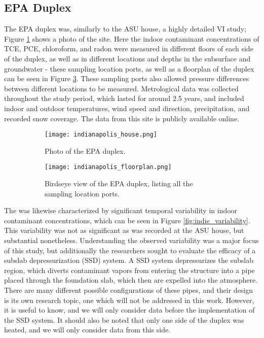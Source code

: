 \subsection{EPA Duplex}

The EPA duplex was, similarly to the ASU house, a highly detailed VI study; Figure \ref{fig:indie_house} shows a photo of the site.
Here the indoor contaminant concentrations of TCE, PCE, chloroform, and radon were measured in different floors of each side of the duplex, as well as in different locations and depths in the subsurface and groundwater - these sampling location ports, as well as a floorplan of the duplex can be seen in Figure \ref{fig:indie_floorplan}.
These sampling ports also allowed pressure differences between different locations to be measured.
Metrological data was collected throughout the study period, which lasted for around 2.5 years, and included indoor and outdoor temperatures, wind speed and direction, precipitation, and recorded snow coverage\cite{u.s._environmental_protection_agency_assessment_2015}.
The data from this site is publicly available online\cite{noauthor_indianapolis_nodate}.\par

\begin{figure}[htb!]
  \centering
  \begin{subfigure}[t]{0.35\textwidth}
    \centering
    \texttt{[image: indianapolis\_house.png]}
    \caption{Photo of the EPA duplex.}
    \label{fig:indie_house}
  \end{subfigure}
  \begin{subfigure}[t]{0.60\textwidth}
    \centering
    \texttt{[image: indianapolis\_floorplan.png]}
    \caption{Birdseye view of the EPA duplex, listing all the sampling location ports.}
    \label{fig:indie_floorplan}
  \end{subfigure}
  \caption{}
\end{figure}

The was likewise characterized by significant temporal variability in indoor contaminant concentrations, which can be seen in Figure \ref{fig:indie_variability}.
This variability was not as significant as was recorded at the ASU house, but substantial nonetheless.
Understanding the observed variability was a major focus of this study, but additionally the researchers sought to evaluate the efficacy of a subslab depressurization (SSD) system.
A SSD system depressurizes the subslab region, which diverts contaminant vapors from entering the structure into a pipe placed through the foundation slab, which then are expelled into the atmosphere\cite{u.s._environmental_protection_agency_assessment_2015}.
There are many different possible configurations of these pipes, and their design is its own research topic, one which will not be addressed in this work.
However, it is useful to know, and we will only consider data before the implementation of the SSD system.
It should also be noted that only one side of the duplex was heated, and we will only consider data from this side.\par

